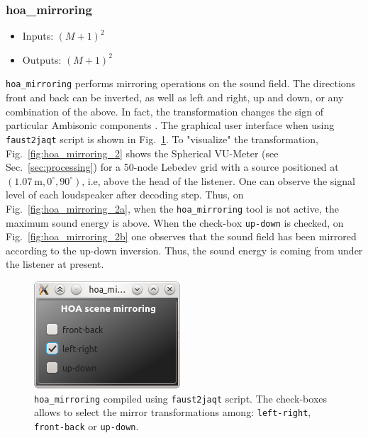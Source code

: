 \documentclass[10pt,a4paper]{article}
\begin{document}
\subsubsection{hoa\_mirroring}
\begin{itemize}
\item Inputs: $(M+1)^2$
\item Outputs: $(M+1)^2$
\end{itemize}
\lstinline'hoa_mirroring' performs mirroring operations on the sound field. The directions front and back can be inverted, as well as left and right, up and down, or any combination of the above. In fact, the transformation changes the sign of particular Ambisonic components \cite{kronlachner2014spatial}. The graphical user interface when using \lstinline'faust2jaqt' script is shown in Fig.~\ref{fig:hoa_mirroring}. To "visualize" the transformation, Fig.~\ref{fig:hoa_mirroring_2} shows the Spherical VU-Meter (see Sec.~\ref{sec:processing}) for a 50-node Lebedev grid with a source positioned at $(1.07~\text{m}, 0^\circ, 90^\circ)$, i.e, above the head of the listener. One can observe the signal level of each loudspeaker after decoding step. Thus, on Fig.~\ref{fig:hoa_mirroring_2a}, when the \lstinline'hoa_mirroring' tool is not active, the maximum sound energy is above. When the check-box \lstinline'up-down' is checked, on Fig.~\ref{fig:hoa_mirroring_2b} one observes that the sound field has been mirrored according to the up-down inversion. Thus, the sound energy is coming from under the listener at present.
\begin{figure}[!ht]
\centering
\includegraphics[width=0.3\columnwidth]{hoa_mirroring.png}
\caption{\lstinline'hoa_mirroring' compiled using \lstinline'faust2jaqt' script. The check-boxes allows to select the mirror transformations among: \lstinline'left-right', \lstinline'front-back' or \lstinline'up-down'.}
\label{fig:hoa_mirroring}
\end{figure}
\end{document}
